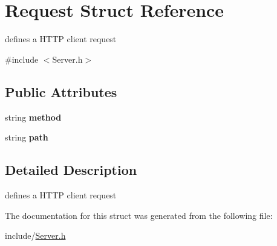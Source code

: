 \hypertarget{struct_request}{}\section{Request Struct Reference}
\label{struct_request}


defines a H\+T\+TP client request  




{\ttfamily \#include $<$Server.\+h$>$}

\subsection*{Public Attributes}
\begin{DoxyCompactItemize}
\item 
\mbox{\label{struct_request_a39b989ccc181b152b7c8cd3131f4cbfa}} 
string {\bfseries method}
\item 
\mbox{\label{struct_request_ae760d43b98dc8c8714d217a8cb28ab55}} 
string {\bfseries path}
\end{DoxyCompactItemize}


\subsection{Detailed Description}
defines a H\+T\+TP client request 

The documentation for this struct was generated from the following file\+:\begin{DoxyCompactItemize}
\item 
include/\hyperlink{_server_8h}{Server.\+h}\end{DoxyCompactItemize}
